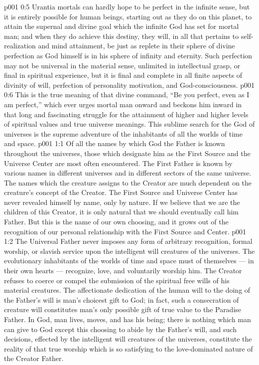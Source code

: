 \vs p001 0:5 Urantia mortals can hardly hope to be perfect in the infinite sense, but it is entirely possible for human beings, starting out as they do on this planet, to attain the supernal and divine goal which the infinite God has set for mortal man; and when they do achieve this destiny, they will, in all that pertains to self\hyp{}realization and mind attainment, be just as replete in their sphere of divine perfection as God himself is in his sphere of infinity and eternity. Such perfection may not be universal in the material sense, unlimited in intellectual grasp, or final in spiritual experience, but it is final and complete in all finite aspects of divinity of will, perfection of personality motivation, and God\hyp{}consciousness.
\vs p001 0:6 This is the true meaning of that divine command, “Be you perfect, even as I am perfect,” which ever urges mortal man onward and beckons him inward in that long and fascinating struggle for the attainment of higher and higher levels of spiritual values and true universe meanings. This sublime search for the God of universes is the supreme adventure of the inhabitants of all the worlds of time and space.
\vs p001 1:1 Of all the names by which God the Father is known throughout the universes, those which designate him as the First Source and the Universe Center are most often encountered. The First Father is known by various names in different universes and in different sectors of the same universe. The names which the creature assigns to the Creator are much dependent on the creature’s concept of the Creator. The First Source and Universe Center has never revealed himself by name, only by nature. If we believe that we are the children of this Creator, it is only natural that we should eventually call him Father. But this is the name of our own choosing, and it grows out of the recognition of our personal relationship with the First Source and Center.
\vs p001 1:2 The Universal Father never imposes any form of arbitrary recognition, formal worship, or slavish service upon the intelligent will creatures of the universes. The evolutionary inhabitants of the worlds of time and space must of themselves --- in their own hearts --- recognize, love, and voluntarily worship him. The Creator refuses to coerce or compel the submission of the spiritual free wills of his material creatures. The affectionate dedication of the human will to the doing of the Father’s will is man’s choicest gift to God; in fact, such a consecration of creature will constitutes man’s only possible gift of true value to the Paradise Father. In God, man lives, moves, and has his being; there is nothing which man can give to God except this choosing to abide by the Father’s will, and such decisions, effected by the intelligent will creatures of the universes, constitute the reality of that true worship which is so satisfying to the love\hyp{}dominated nature of the Creator Father.
